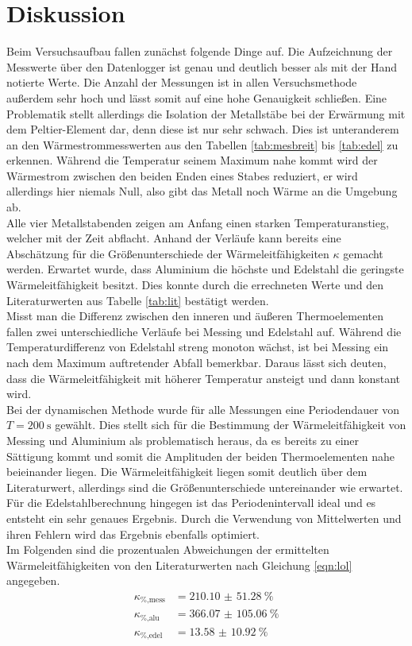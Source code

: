 \section{Diskussion}

Beim Versuchsaufbau fallen zunächst folgende Dinge auf. Die Aufzeichnung der Messwerte über den Datenlogger ist genau und deutlich besser als mit der Hand notierte Werte. Die Anzahl der Messungen
ist in allen Versuchsmethode außerdem sehr hoch und lässt somit auf eine hohe Genauigkeit schließen. Eine Problematik stellt allerdings die Isolation der Metallstäbe bei der Erwärmung mit dem Peltier-Element dar, denn
diese ist nur sehr schwach. Dies ist unteranderem an den Wärmestrommesswerten aus den Tabellen \ref{tab:mesbreit} bis \ref{tab:edel} zu erkennen. Während die Temperatur seinem Maximum nahe kommt wird der Wärmestrom zwischen den beiden Enden eines Stabes 
reduziert, er wird allerdings hier niemals Null, also gibt das Metall noch Wärme an die Umgebung ab.
\\
\newline
Alle vier Metallstabenden zeigen am Anfang einen starken Temperaturanstieg, welcher mit der Zeit abflacht. Anhand der Verläufe kann bereits eine Abschätzung für die Größenunterschiede der Wärmeleitfähigkeiten 
$\kappa$ gemacht werden. Erwartet wurde, dass Aluminium die höchste und Edelstahl die geringste Wärmeleitfähigkeit besitzt. Dies konnte durch die errechneten Werte und den Literaturwerten aus Tabelle \ref{tab:lit} bestätigt werden.
\\
Misst man die Differenz zwischen den inneren und äußeren Thermoelementen fallen zwei unterschiedliche Verläufe bei Messing und Edelstahl auf. Während die Temperaturdifferenz von Edelstahl streng monoton wächst, ist bei Messing ein 
nach dem Maximum auftretender Abfall bemerkbar. Daraus lässt sich deuten, dass die Wärmeleitfähigkeit mit höherer Temperatur ansteigt und dann konstant wird.
\\
\newline
Bei der dynamischen Methode wurde für alle Messungen eine Periodendauer von $T = \SI{200}{\second}$ gewählt. Dies stellt sich für die Bestimmung der Wärmeleitfähigkeit von Messing und Aluminium als problematisch heraus, da es bereits
zu einer Sättigung kommt und somit die Amplituden der beiden Thermoelementen nahe beieinander liegen. Die Wärmeleitfähigkeit liegen somit deutlich über dem Literaturwert, allerdings sind die Größenunterschiede untereinander wie erwartet.
Für die Edelstahlberechnung hingegen ist das Periodenintervall ideal und es entsteht ein sehr genaues Ergebnis. Durch die Verwendung von Mittelwerten und ihren Fehlern wird das Ergebnis ebenfalls optimiert.
\\
\newline
Im Folgenden sind die prozentualen Abweichungen der ermittelten Wärmeleitfähigkeiten von den Literaturwerten nach Gleichung \ref{eqn:lol} angegeben.
\begin{align}
\kappa_{\si{\percent}\text{,mess}} &=  \SI{210.10(5128)}{\percent} \\ 
\kappa_{\si{\percent}\text{,alu}} &=   \SI{366.07(10506)}{\percent} \\
\kappa_{\si{\percent}\text{,edel}} &= \SI{13.58(1092)}{\percent}
\end{align}